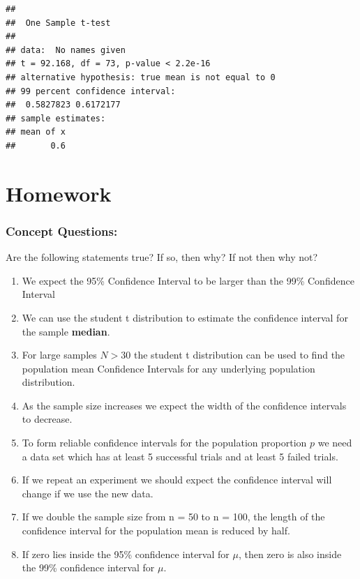 \documentclass[
]{book}
\providecommand{\tightlist}{%
  \setlength{\itemsep}{0pt}\setlength{\parskip}{0pt}}
\theoremstyle{definition}
\theoremstyle{definition}
\theoremstyle{definition}
\theoremstyle{definition}
\theoremstyle{remark}
\begin{document}
\begin{verbatim}
## 
##  One Sample t-test
## 
## data:  No names given
## t = 92.168, df = 73, p-value < 2.2e-16
## alternative hypothesis: true mean is not equal to 0
## 99 percent confidence interval:
##  0.5827823 0.6172177
## sample estimates:
## mean of x 
##       0.6
\end{verbatim}

\hypertarget{homework-8}{%
\section{Homework}\label{homework-8}}

\hypertarget{concept-questions-7}{%
\subsubsection{Concept Questions:}\label{concept-questions-7}}

Are the following statements true? If so, then why? If not then why not?

\begin{enumerate}
\def\labelenumi{\arabic{enumi}.}
\tightlist
\item
  We expect the 95\% Confidence Interval to be larger than the 99\% Confidence Interval
\item
  We can use the student t distribution to estimate the confidence interval for the sample \textbf{median}.
\item
  For large samples \(N>30\) the student t distribution can be used to find the population mean Confidence Intervals for any underlying population distribution.
\item
  As the sample size increases we expect the width of the confidence intervals to decrease.
\item
  To form reliable confidence intervals for the population proportion \(p\) we need a data set which has at least 5 successful trials and at least 5 failed trials.
\item
  If we repeat an experiment we should expect the confidence interval will change if we use the new data.
\item
  If we double the sample size from n = 50 to n = 100, the length of the confidence interval for the population mean is reduced by half.
\item
  If zero lies inside the 95\% confidence interval for \(\mu\), then zero is also inside the 99\% confidence interval for \(\mu\).
\end{enumerate}
\end{document}
